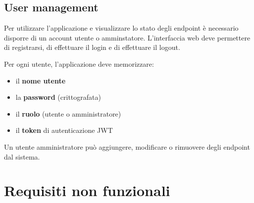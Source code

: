 \documentclass{article}
\begin{document}
\subsection{User management}

Per utilizzare l'applicazione e visualizzare lo stato degli endpoint è necessario disporre di un account utente o amminstatore.
L'interfaccia web deve permettere di registrarsi, di effettuare il login e di effettuare il logout.

Per ogni utente, l'applicazione deve memorizzare:
\begin{itemize}
    \item il \textbf{nome utente}
    \item la \textbf{password} (crittografata)
    \item il \textbf{ruolo} (utente o amministratore)
    \item il \textbf{token} di autenticazione JWT
\end{itemize}

Un utente amministratore può aggiungere, modificare o rimuovere degli endpoint dal sistema.










\section{Requisiti non funzionali}
\label{sec:requisiti_non_funzionali}
\end{document}
